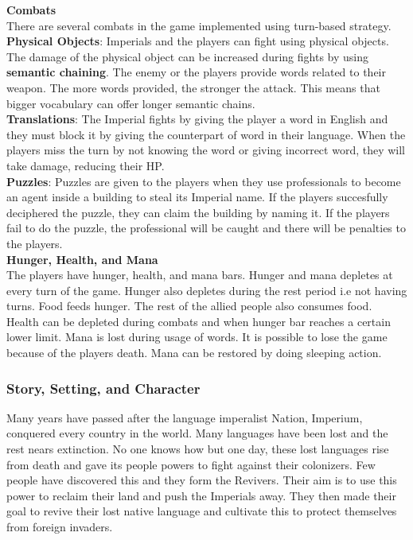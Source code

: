 \documentclass[11pt]{article}
\begin{document}
\textbf{Combats}\\
There are several combats in the game implemented using turn-based strategy.\\
\textbf{Physical Objects}:
Imperials and the players can fight using physical objects. The damage of the physical object can be increased during fights by using \textbf{semantic chaining}. The enemy or the players provide words related to their weapon. The more words provided, the stronger the attack. This means that bigger vocabulary can offer longer semantic chains.\\
\textbf{Translations}:
The Imperial fights by giving the player a word in English and they must block it by giving the counterpart of word in their language. When the players miss the turn by not knowing the word or giving incorrect word, they will take damage, reducing their HP.\\
\textbf{Puzzles}:
Puzzles are given to the players when they use professionals to become an agent inside a building to steal its Imperial name. If the players succesfully deciphered the puzzle, they can claim the building by naming it. If the players fail to do the puzzle, the professional will be caught and there will be penalties to the players. \\

\textbf{Hunger, Health, and Mana}\\
The players have hunger, health, and mana bars. Hunger and mana depletes at every turn of the game. Hunger also depletes during the rest period i.e not having turns. Food feeds hunger. The rest of the allied people also consumes food. Health can be depleted during combats and when hunger bar reaches a certain lower limit. Mana is lost  during usage of words. It is possible to lose the game because of the players death. Mana can be restored by doing sleeping action.\\ 


\subsubsection{Story, Setting, and Character}
Many years have passed after the language imperalist Nation, Imperium, conquered every country in the world. Many languages have been lost and the rest nears extinction. No one knows how but one day, these lost languages rise from death and gave its people powers to fight against their colonizers. Few people have discovered this and they form the Revivers. Their aim is to use this power to reclaim their land and push the Imperials away. They then made their goal to revive their lost native language and cultivate this to protect themselves from foreign invaders. 
\end{document}
